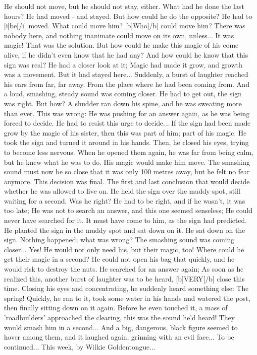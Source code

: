 He should not move, but he should not stay, either. 
What had he done the last hours? He had moved - and stayed. But how could he do the opposite? 
He had to [i]be[/i] moved. What could move him? [b]Who[/b] could move him? There was nobody here, and nothing inanimate could move on its own, unless... 
It was magic! That was the solution. But how could he make this magic of his come alive, if he didn't even know that he had any? 
And how could he know that this sign was real? 
He had a closer look at it; Magic had made it grow, and growth was a movement. But it had stayed here... 
Suddenly, a burst of laughter reached his ears from far, far away. 
From the place where he had been coming from. 
And a loud, smashing, steady sound was coming closer. He had to get out, the sign was right. But how? 
A shudder ran down his spine, and he was sweating more than ever. This was wrong: He was pushing for an answer again, as he was being forced to decide. He had to resist this urge to decide... 
If the sign had been made grow by the magic of his sister, then this was part of him; part of his magic. He took the sign and turned it around in his hands. Then, he closed his eyes, trying to become less nervous. When he opened them again, he was far from being calm, but he knew what he was to do. 
His magic would make him move. 
The smashing sound must now be so close that it was only 100 metres away, but he felt no fear anymore. This decision was final. 
The first and last conclusion that would decide whether he was allowed to live on. 
He held the sign over the muddy spot, still waiting for a second. Was he right? He had to be right, and if he wasn't, it was too late; He was not to search an answer, and this one seemed senseless; He could never have searched for it. 
It must have come to him, as the sign had predicted. 
He planted the sign in the muddy spot and sat down on it. He sat down on the sign. Nothing happened; what was wrong? 
The smashing sound was coming closer... 
Yes! He would not only need his, but their magic, too! 
Where could he get their magic in a second? He could not open his bag that quickly, and he would risk to destroy the nuts. He searched for an answer again; As soon as he realized this, another burst of laughter was to be heard, [b]VERY[/b] close this time. 
Closing his eyes and concentrating, he suddenly heard something else: The spring! Quickly, he ran to it, took some water in his hands and watered the post, then finally sitting down on it again. 
Before he even touched it, a mass of 'roadbuilders' approached the clearing, this was the sound he'd heard! They would smash him in a second... 
And a big, dangerous, black figure seemed to hover among them, and it laughed again, grinning with an evil face... 
To be continued...
This week, by Wilkie Goldentongue...

